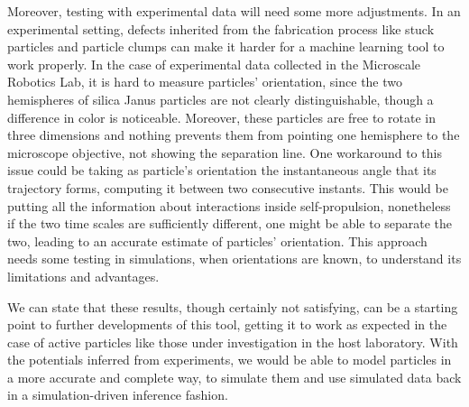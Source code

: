 \documentclass[../../master_thesis_np.tex]{subfiles}
\begin{document}
Moreover, testing with experimental data will need some more adjustments.
In an experimental setting, defects inherited from the fabrication process like stuck particles and particle clumps can make it harder for a machine learning tool to work properly.
In the case of experimental data collected in the Microscale Robotics Lab, it is hard to measure particles' orientation, since the two hemispheres of silica Janus particles are not clearly distinguishable, though a difference in color is noticeable.
Moreover, these particles are free to rotate in three dimensions and nothing prevents them from pointing one hemisphere to the microscope objective, not showing the separation line.
One workaround to this issue could be taking as particle's orientation the instantaneous angle that its trajectory forms, computing it between two consecutive instants.
This would be putting all the information about interactions inside self-propulsion, nonetheless if the two time scales are sufficiently different, one might be able to separate the two, leading to an accurate estimate of particles' orientation.
This approach needs some testing in simulations, when orientations are known, to understand its limitations and advantages.

We can state that these results, though certainly not satisfying, can be a starting point to further developments of this tool, getting it to work as expected in the case of active particles like those under investigation in the host laboratory.
With the potentials inferred from experiments, we would be able to model particles in a more accurate and complete way, to simulate them and use simulated data back in a simulation-driven inference fashion.
\end{document}
